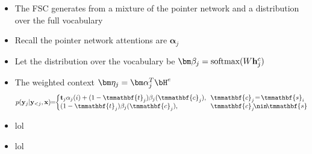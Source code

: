 \begin{frame}
\begin{center}
\end{center}    
\begin{itemize}
    \item The FSC generates from a mixture of the pointer network and a distribution over the full vocabulary
    \item Recall the pointer network attentions are $\bm\alpha_j$
    \item Let the distribution over the vocabulary be $\bm\beta_j = \textrm{softmax}(W\bh_j^c)$
    \item The weighted context $\bm\eta_j = \bm\alpha_j^T \bH^e$
    \begin{align}                                                                                                             
  & p ( \by_j | \by_{<j}, \bx )                                                             
\!\!  = \!\! \left\{\!\!\! \begin{array}{ll}                                                                              
     \bt_j \alpha_j(i) + (1-\tmmathbf{t}_j)  \beta_j(\tmmathbf{c}_j), & \!\!  \tmmathbf{c}_j\!=\!\tmmathbf{s}_i\\
     (1-\tmmathbf{t}_j)  \beta_j(\tmmathbf{c}_j), & \!\!  \tmmathbf{c}_j \!\nin\! \tmmathbf{s}                            
   \end{array} \right.                                                               
\end{align}                                                                                                               

\end{itemize}
\end{frame}

\begin{frame}
\begin{center}
\end{center}
\begin{itemize}
\item lol
\end{itemize}
\end{frame}


\begin{frame}
\begin{center}
\end{center}
\begin{itemize}
\item lol
\end{itemize}
\end{frame}

